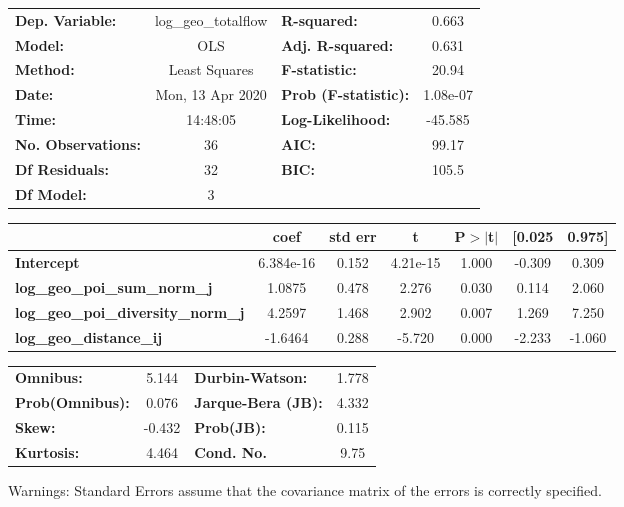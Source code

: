 \begin{center}
\begin{tabular}{lclc}
\toprule
\textbf{Dep. Variable:}                    & log\_geo\_totalflow & \textbf{  R-squared:         } &     0.663   \\
\textbf{Model:}                            &         OLS         & \textbf{  Adj. R-squared:    } &     0.631   \\
\textbf{Method:}                           &    Least Squares    & \textbf{  F-statistic:       } &     20.94   \\
\textbf{Date:}                             &   Mon, 13 Apr 2020  & \textbf{  Prob (F-statistic):} &  1.08e-07   \\
\textbf{Time:}                             &       14:48:05      & \textbf{  Log-Likelihood:    } &   -45.585   \\
\textbf{No. Observations:}                 &            36       & \textbf{  AIC:               } &     99.17   \\
\textbf{Df Residuals:}                     &            32       & \textbf{  BIC:               } &     105.5   \\
\textbf{Df Model:}                         &             3       & \textbf{                     } &             \\
\bottomrule
\end{tabular}
\begin{tabular}{lcccccc}
                                           & \textbf{coef} & \textbf{std err} & \textbf{t} & \textbf{P$> |$t$|$} & \textbf{[0.025} & \textbf{0.975]}  \\
\midrule
\textbf{Intercept}                         &    6.384e-16  &        0.152     &  4.21e-15  &         1.000        &       -0.309    &        0.309     \\
\textbf{log\_geo\_poi\_sum\_norm\_j}       &       1.0875  &        0.478     &     2.276  &         0.030        &        0.114    &        2.060     \\
\textbf{log\_geo\_poi\_diversity\_norm\_j} &       4.2597  &        1.468     &     2.902  &         0.007        &        1.269    &        7.250     \\
\textbf{log\_geo\_distance\_ij}            &      -1.6464  &        0.288     &    -5.720  &         0.000        &       -2.233    &       -1.060     \\
\bottomrule
\end{tabular}
\begin{tabular}{lclc}
\textbf{Omnibus:}       &  5.144 & \textbf{  Durbin-Watson:     } &    1.778  \\
\textbf{Prob(Omnibus):} &  0.076 & \textbf{  Jarque-Bera (JB):  } &    4.332  \\
\textbf{Skew:}          & -0.432 & \textbf{  Prob(JB):          } &    0.115  \\
\textbf{Kurtosis:}      &  4.464 & \textbf{  Cond. No.          } &     9.75  \\
\bottomrule
\end{tabular}
\end{center}

Warnings: \newline
 [1] Standard Errors assume that the covariance matrix of the errors is correctly specified.